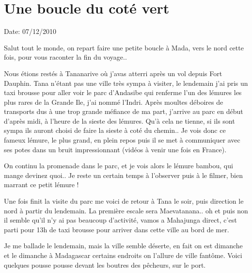 \section{Une boucle du coté vert}

Date: 07/12/2010

\begin{multicols}{2}

Salut tout le monde, on repart faire une petite boucle à Mada, vers le nord cette fois, pour vous raconter la fin du voyage..

Nous étions restés à Tananarive où j'avas atterri après un vol depuis Fort Dauphin. Tana n'étant pas une ville très sympa à visiter, le lendemain j'ai pris un taxi brousse pour aller voir le parc d'Andasibe qui renferme l'un des lémures les plus rares de la Grande Ile, j'ai nommé l'Indri. Après moultes déboires de transports dus à une trop grande méfiance de ma part, j'arrive au parc en début d'après midi, à l'heure de la sieste des lémures. Qu'à cela ne tienne, si ils sont sympa ils auront choisi de faire la sieste à coté du chemin.. Je vois donc ce fameux lémure, le plus grand, en plein repos puis il se met à communiquer avec ses potes dans un bruit impressionnant (vidéos à venir une fois en France).


On continu la promenade dans le parc, et je vois alors le lémure bambou, qui mange devinez quoi.. Je reste un certain temps à l'observer puis à le filmer, bien marrant ce petit lémure !


Une fois finit la visite du parc me voici de retour à Tana le soir, puis direction le nord à partir du lendemain. La première escale sera Maevatanana.. oh et puis non il semble qu'il n'y ai pas beaucoup d'activité, vamos a Mahajunga direct, c'est parti pour 13h de taxi brousse pour arriver dans cette ville au bord de mer.

Je me ballade le lendemain, mais la ville semble déserte, en fait on est dimanche et le dimanche à Madagascar certains endroits on l'allure de ville fantôme. Voici quelques pousse pousse devant les boutres des pêcheurs, sur le port.



\end{multicols}
